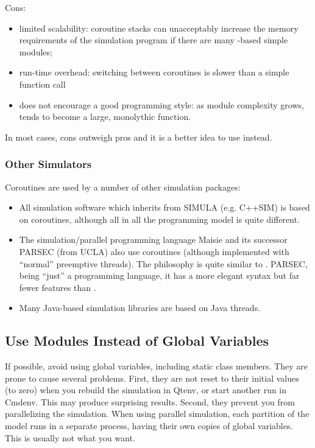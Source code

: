 Cons:
\begin{itemize}
   \item limited scalability: coroutine stacks can unacceptably increase the
       memory requirements of the simulation program if there are many
       -based simple modules;
   \item run-time overhead: switching between coroutines is slower than
       a simple function call
   \item does not encourage a good programming style: as module complexity
       grows,  tends to become a large, monolythic function.
\end{itemize}

In most cases, cons outweigh pros and it is a better idea to use
 instead.


\subsubsection{Other Simulators}
\label{sec:simple-modules:activity:other-simulators}

Coroutines are used by a number of other simulation packages:
\begin{itemize}
\item All simulation software which inherits from SIMULA (e.g. C++SIM)
    is based on coroutines, although all in all the programming
    model is quite different.
\item The simulation/parallel programming language Maisie and its successor
    PARSEC (from UCLA) also use coroutines (although implemented
    with ``normal'' preemptive threads). The philosophy
    is quite similar to {\opp}. PARSEC, being ``just''
    a programming language, it has a more elegant syntax but far fewer
    features than {\opp}.
\item Many Java-based simulation libraries are based on Java
    threads.
\end{itemize}

\subsection{Use Modules Instead of Global Variables}
\label{sec:simple-modules:global-vars}

If possible, avoid using global variables, including
static class members. They are prone to cause several problems.
First, they are not reset to their initial values (to zero)
when you rebuild the simulation in Qtenv, or start another run
in Cmdenv. This may produce surprising results.
Second, they prevent you from parallelizing the simulation.
When using parallel simulation, each partition of the model
runs in a separate process, having their own copies of
global variables. This is usually not what you want.

